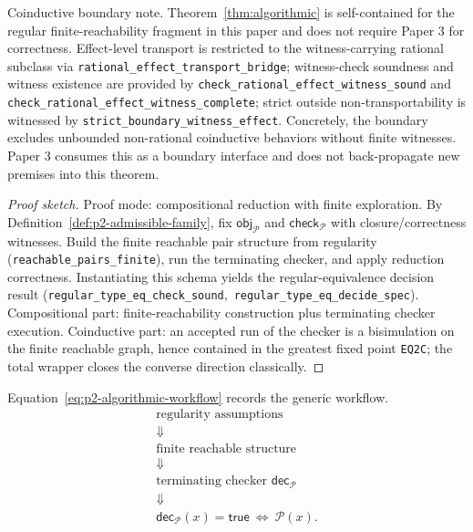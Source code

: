 \documentclass[a4paper,10pt,twocolumn,english]{article}
\numberwithin{equation}{section}
\theoremstyle{paperdef}
\theoremstyle{paperplain}
\theoremstyle{paperdef}
\theoremstyle{paperremark}
\begin{document}
Coinductive boundary note. Theorem~\ref{thm:algorithmic} is self-contained for
the regular finite-reachability fragment in this paper and does not require
Paper 3 for correctness. Effect-level transport is restricted to the
witness-carrying rational subclass via
\nolinkurl{rational_effect_transport_bridge}; witness-check
soundness and witness existence are provided by
\nolinkurl{check_rational_effect_witness_sound} and
\nolinkurl{check_rational_effect_witness_complete}; strict outside
non-transportability is witnessed by
\nolinkurl{strict_boundary_witness_effect}. Concretely, the boundary excludes
unbounded non-rational coinductive behaviors without finite witnesses. Paper 3
consumes this as a boundary interface and does not back-propagate new premises
into this theorem.

\begin{proof}[Proof sketch]
	Proof mode: compositional reduction with finite exploration. By Definition~\ref{def:p2-admissible-family}, fix $\mathsf{obj}_{\mathcal{P}}$ and $\mathsf{check}_{\mathcal{P}}$ with closure/correctness witnesses. Build the finite reachable pair structure from regularity (\nolinkurl{reachable_pairs_finite}), run the terminating checker, and apply reduction correctness. Instantiating this schema yields the regular-equivalence decision result (\nolinkurl{regular_type_eq_check_sound},\allowbreak\ \nolinkurl{regular_type_eq_decide_spec}).
	Compositional part: finite-reachability construction plus terminating checker
	execution. Coinductive part: an accepted run of the checker is a
	bisimulation on the finite reachable graph, hence contained in the greatest
	fixed point \texttt{EQ2C}; the total wrapper closes the converse direction
	classically.
\end{proof}

Equation~\ref{eq:p2-algorithmic-workflow} records the generic workflow.
\begin{equation}
	\label{eq:p2-algorithmic-workflow}
	\begin{array}{c}
		\text{regularity assumptions}
		\\
		\Downarrow
		\\
		\text{finite reachable structure}
		\\
		\Downarrow
		\\
		\text{terminating checker } \mathsf{dec}_{\mathcal{P}}
		\\
		\Downarrow
		\\
		\mathsf{dec}_{\mathcal{P}}(x)=\mathsf{true}\ \Longleftrightarrow\ \mathcal{P}(x).
	\end{array}
\end{equation}
\end{document}

